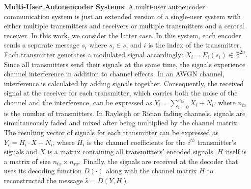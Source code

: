 \textbf{Multi-User Autonencoder Systems}: A multi-user autoencoder communication system is just an extended version of a single-user system with either multiple transmitters and receivers or multiple transmitters and a central receiver. In this work, we consider the latter case. In this system, each encoder sends a separate message \(s_i\) where \(s_i \in s\), and \(i\) is the index of the transmitter. Each transmitter generates a modulated signal accordingly: \(X_i = E_i(s_i) \in \mathbb{R}^{2n}\). Since all transmitters send their signals at the same time, the signals experience channel interference in addition to channel effects. In an AWGN channel, interference is calculated by adding signals together. Consequently, the received signal at the receiver for each transmitter, which carries both the noise of the channel and the interference, can be expressed as \(Y_i = \sum_{i=0}^{n_{tx}}X_i + N_i\), where \(n_{tx}\) is the number of transmitters. In Rayleigh or Rician fading channels, signals are simultaneously faded and mixed after being multiplied by the channel matrix. The resulting vector of signals for each transmitter can be expressed as \(Y_i = H_i \cdot X + N_i\), where \(H_i\) is the channel coefficients for the \(i^{th}\) transmitter's signals and \(X\) is a matrix containing all transmitters' encoded signals. \(H\) itself is a matrix of size \(n_{tx} \times n_{rx}\). Finally, the signals are received at the decoder that uses its decoding function \(D(\cdot)\) along with the channel matrix \(H\) to reconstructed the message \(\hat{s} = D(Y, H)\).